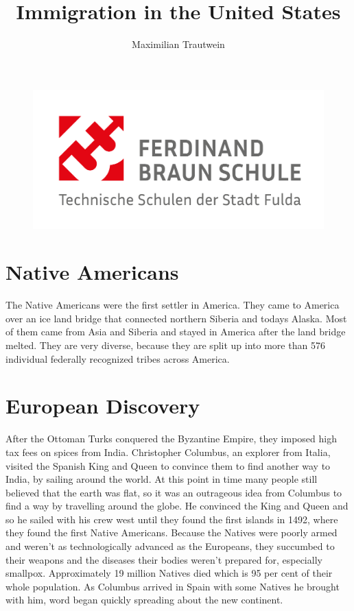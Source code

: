 \documentclass[12pt]{article}
\title{Immigration in the United States}
\author{Maximilian Trautwein}
\begin{document}
	
	\maketitle
	
	\begin{figure}[h]
		\centering
		\includegraphics[width=\textwidth]{FBS-Logo_2021-1}
	\end{figure}
	
	\newpage
	\tableofcontents
	
	\newpage
	
	\section{Native Americans}
	The Native Americans were the first settler in America. They came to America over an ice land bridge that connected northern Siberia and todays Alaska. Most of them came from Asia and Siberia and stayed in America after the land bridge melted. They are very diverse, because they are split up into more than 576 individual federally recognized tribes across America.
	
	\section{European Discovery}
	After the Ottoman Turks conquered the Byzantine Empire, they imposed high tax fees on spices from India. Christopher Columbus, an explorer from Italia, visited the Spanish King and Queen to convince them to find another way to India, by sailing around the world. At this point in time many people still believed that the earth was flat, so it was an outrageous idea from Columbus to find a way by travelling around the globe. He convinced the King and Queen and so he sailed with his crew west until they found the first islands in 1492, where they found the first Native Americans. Because the Natives were poorly armed and weren’t as technologically advanced as the Europeans, they succumbed to their weapons and the diseases their bodies weren’t prepared for, especially smallpox. Approximately 19 million Natives died which is 95 per cent of their whole population. As Columbus arrived in Spain with some Natives he brought with him, word began quickly spreading about the new continent. 
	
\end{document}

